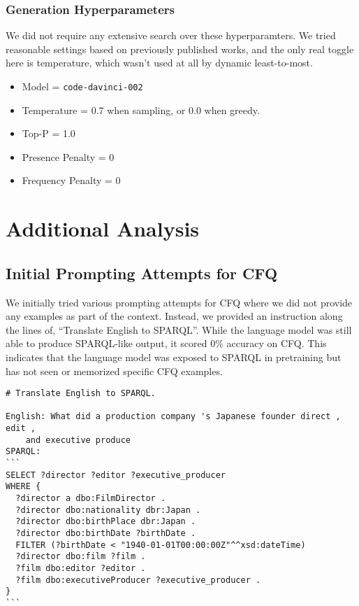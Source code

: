 \documentclass{article} \usepackage{iclr2022_conference,times}
\begin{document}
\subsubsection{Generation Hyperparameters}

We did not require any extensive search over these hyperparamters. We tried reasonable settings based on previously published works, and the only real toggle here is temperature, which wasn't used at all by dynamic least-to-most.

\begin{itemize}
    \item Model = \texttt{code-davinci-002}
    \item Temperature = 0.7 when sampling, or 0.0 when greedy.
    \item Top-P = 1.0
    \item Presence Penalty = 0
    \item Frequency Penalty = 0
\end{itemize}

\section{Additional Analysis}
\label{app:additional_analysis}

\subsection{Initial Prompting Attempts for CFQ \label{app:cfq_initial}}

We initially tried various prompting attempts for CFQ where we did not provide any examples as part of the context. Instead, we provided an instruction along the lines of, ``Translate English to SPARQL''. While the language model was still able to produce SPARQL-like output, it scored 0\% accuracy on CFQ. This indicates that the language model was exposed to SPARQL in pretraining but has not seen or memorized specific CFQ examples.

{\small
\begin{verbatim}
# Translate English to SPARQL. 

English: What did a production company 's Japanese founder direct , edit ,
    and executive produce
SPARQL:
```
SELECT ?director ?editor ?executive_producer
WHERE {
  ?director a dbo:FilmDirector .
  ?director dbo:nationality dbr:Japan .
  ?director dbo:birthPlace dbr:Japan .
  ?director dbo:birthDate ?birthDate .
  FILTER (?birthDate < "1940-01-01T00:00:00Z"^^xsd:dateTime)
  ?director dbo:film ?film .
  ?film dbo:editor ?editor .
  ?film dbo:executiveProducer ?executive_producer .
}
```
\end{verbatim}
}
\end{document}
